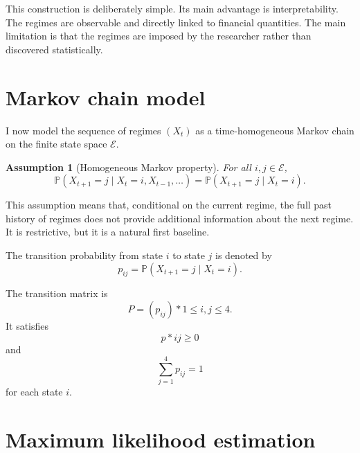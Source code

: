 \documentclass[11pt,a4paper]{article}
\newtheorem{assumption}{Assumption}
\newcommand{\Prob}{\mathbb{P}}
\begin{document}
This construction is deliberately simple. Its main advantage is interpretability. The regimes are observable and directly linked to financial quantities. The main limitation is that the regimes are imposed by the researcher rather than discovered statistically.

\section{Markov chain model}

I now model the sequence of regimes $(X_t)$ as a time-homogeneous Markov chain on the finite state space $\mathcal{E}$.

\begin{assumption}[Homogeneous Markov property]
For all $i,j \in \mathcal{E}$,
\begin{equation}
\Prob(X_{t+1}=j \mid X_t=i, X_{t-1}, \ldots)
=
\Prob(X_{t+1}=j \mid X_t=i).
\end{equation}
\end{assumption}

This assumption means that, conditional on the current regime, the full past history of regimes does not provide additional information about the next regime. It is restrictive, but it is a natural first baseline.

The transition probability from state $i$ to state $j$ is denoted by
\begin{equation}
p_{ij}
=
\Prob(X_{t+1}=j \mid X_t=i).
\end{equation}

The transition matrix is
\begin{equation}
P = (p_{ij})*{1 \leq i,j \leq 4}.
\end{equation}
It satisfies
\begin{equation}
p*{ij} \geq 0
\end{equation}
and
\begin{equation}
\sum_{j=1}^{4}p_{ij}=1
\end{equation}
for each state $i$.

\section{Maximum likelihood estimation}
\end{document}
